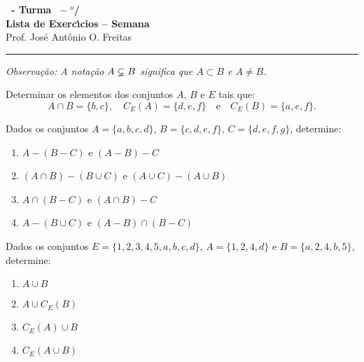\documentclass[12pt]{exam}
\begin{document}
    \begin{center}
    {\Large\bf \disciplina\ - Turma \turma\ -- \semestre$^{o}$/\ano} \\ \vspace{9pt} {\large\bf
        Lista de Exerc{\'\i}cios -- Semana \numerosemana}\\ \vspace{9pt} Prof. Jos{\'e} Ant{\^o}nio O. Freitas
    \end{center}
    \hrule

    \vspace{.6cm}

    \begin{center}
        \textit{Observa\c{c}\~ao: A nota\c{c}\~ao $A \varsubsetneq B$ significa que $A \subset B$ e $A \ne B$.}
    \end{center}

    \questao{} Determinar os elementos dos conjuntos $A$, $B$ e $E$ tais que:
\[
    A \cap B = \{b, c\}, \quad C_E(A) = \{d, e, f\} \quad \mbox{e}\quad C_E(B) = \{a, e, f\}.
\]

\vspace{.3cm}

\questao{} Dados os conjuntos $A = \{a, b, c, d\}$, $B = \{c, d, e, f\}$, $C = \{d, e, f, g\}$, determine:
\begin{enumerate}[label={\alph*})]
    \item $A - (B - C)$ e $(A - B) - C$
    \item $(A \cap B) - (B \cup C)$ e $(A \cup C) - (A \cup B)$
    \item $A \cap (B - C)$ e $(A \cap B) - C$
    \item $A - (B \cup C)$ e $(A - B) \cap (B - C)$
\end{enumerate}

\questao{} Dados os conjuntos $E = \{1,2,3,4,5,a,b,c,d\}$, $A = \{1,2,4,d\}$ e $B = \{a,2,4,b,5\}$, determine:
\begin{multicols}{2}
    \begin{enumerate}[label={\alph*})]
        \item $A \cup B$
        \item $A \cup C_E(B)$
        \item $C_E(A) \cup B$
        \item $C_E(A \cup B)$
    \end{enumerate}
\end{multicols}

\vspace{.3cm}
\end{document}
